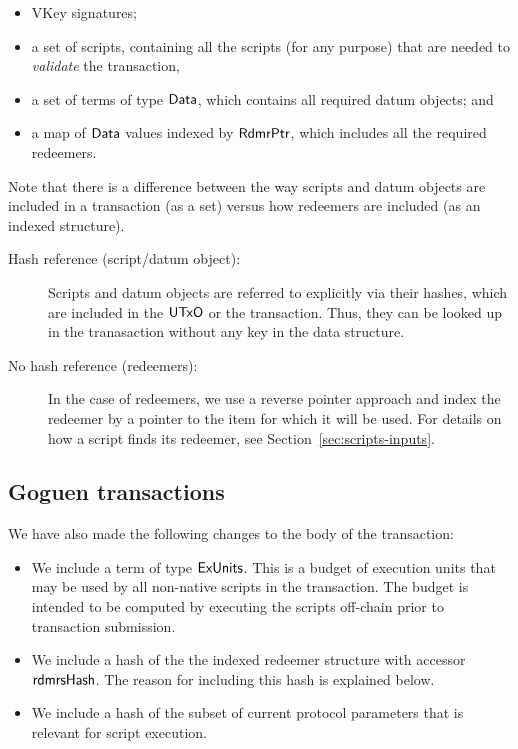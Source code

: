 \begin{itemize}
  \item VKey signatures;
  \item a set of scripts, containing all the scripts (for any purpose) that are needed to \emph{validate} the transaction,
  \item a set of terms of type $\mathsf{Data}$, which contains all required datum objects; and
  \item a map of $\mathsf{Data}$ values indexed by $\mathsf{RdmrPtr}$, which includes all the
  required redeemers.
\end{itemize}

Note that there is a difference between the way scripts and datum objects are included in
a transaction (as a set) versus how redeemers are included
(as an indexed structure). %

\begin{description}
\item
  [Hash reference (script/datum object):]
  Scripts and datum objects are referred to explicitly via their hashes,
  which are included in the $\mathsf{UTxO}$ or the transaction. Thus, they can be
  looked up in the tranasaction without any key in the data structure.

  \item[No hash reference (redeemers):] In the case of redeemers,
  we use a reverse pointer approach and
  index the redeemer by a pointer to the item for which it will be used.
  For details on how a script finds its redeemer, see Section~\ref{sec:scripts-inputs}.
\end{description}

\subsection{Goguen transactions}
We have also made the following changes to
the body of the transaction:

\begin{itemize}
  \item We include a term of type $\mathsf{ExUnits}$. This is a budget of execution units
  that may be used by all non-native scripts in the transaction.
  The budget is intended to be computed by executing the scripts off-chain prior to transaction submission.
  \item We include a hash of the the indexed redeemer structure
    with accessor $\mathsf{rdmrsHash}$. The reason for including this hash is explained below.
  \item We include a hash of the subset of current protocol parameters that is relevant for script execution.
\end{itemize}

